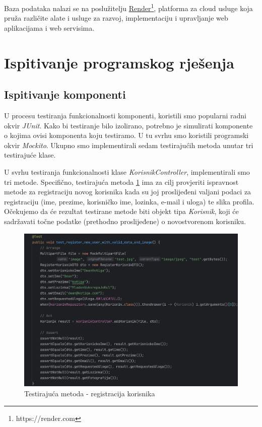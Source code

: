 Baza podataka nalazi se na poslužitelju \underline{Render}\footnote{https://render.com}, platforma za cloud usluge koja pruža različite alate i usluge za razvoj, implementaciju i upravljanje web aplikacijama i web servisima. 

\eject


\section{Ispitivanje programskog rješenja}




\subsection{Ispitivanje komponenti}
U procesu testiranja funkcionalnosti komponenti,  koristili smo popularni radni okvir \textit{JUnit}. Kako bi testiranje bilo izolirano, potrebno je simulirati komponente o kojima ovisi komponenta koju testiramo. U tu svrhu smo koristili programski okvir \textit{Mockito}. Ukupno smo implementirali sedam testirajućih metoda unutar tri testirajuće klase.

\vspace{1em}

U svrhu testiranja funkcionalnosti klase \textit{KorisnikController}, implementirali smo tri metode. Specifično, testirajuća metoda \ref{fig:test1} ima za cilj provjeriti ispravnost metode za registraciju novog korisnika kada su joj proslijeđeni valjani podaci za registraciju (ime, prezime, korisničko ime, lozinka, e-mail i uloga) te slika profila. Očekujemo da će rezultat testirane metode biti objekt tipa \textit{Korisnik}, koji će sadržavati točne podatke (prethodno proslijeđene) o novostvorenom korisniku.

\begin{figure}[H]
	\includegraphics[scale=0.15]{slike/test1.png}
	\centering
	\caption{Testirajuća metoda - registracija korisnika}
	\label{fig:test1}
\end{figure}

